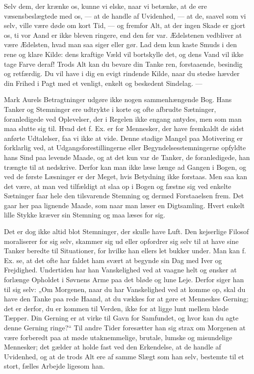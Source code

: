 \documentclass[12pt,a4paper,openany]{book}
\newcommand{\opage}[1]{\marginnote{\footnotesize\textit{[#1]}}}
\begin{document}
Selv dem, der krænke os, kunne vi elske, naar vi betænke,
at de ere væsensbeslægtede med os, --- at de handle
af Uvidenhed, --- at de, saavel som vi selv, ville være døde
om kort Tid, --- og fremfor Alt, at der ingen Skade er gjort
os, ti vor Aand er ikke bleven ringere, end den før var. Ædelstenen
vedbliver at være Ædelsten, hvad man saa siger eller
\setcounter{footnote}{0}%
\opage{113}gør. Lad dem kun kaste Smuds i den rene og klare Kilde:
dens kraftige Væld vil bortskylle det, og dens Vand vil ikke
tage Farve deraf! Trods Alt kan du bevare din Tanke ren,
forstaaende, besindig og retfærdig. Du vil have i dig en evigt
rindende Kilde, naar du stedse hævder din Frihed i Pagt med
et venligt, enkelt og beskedent Sindelag. ---

Mark Aurels Betragtninger udgøre ikke nogen sammenhængende
Bog. Hans Tanker og Stemninger ere udtrykte
i korte og ofte afbrudte Sætninger, foranledigede ved Oplevelser,
der i Regelen ikke engang antydes, men som man
maa slutte sig til. Hvad det f. Ex. er for Mennesker, der
have fremkaldt de sidst anførte Udtalelser, faa vi ikke at vide.
Denne stadige Mangel paa Motivering er forklarlig ved, at Udgangsforestillingerne
eller Begyndelsesstemningerne opfyldte hans
Sind paa levende Maade, og at det kun var de Tanker, de
foranledigede, han trængte til at nedskrive. Derfor kan man
ikke læse længe ad Gangen i Bogen, og ved de første Læsninger
er der Meget, hvis Betydning ikke forstaas. Men saa
kan det være, at man ved tilfældigt at slaa op i Bogen og
fæstne sig ved enkelte Sætninger faar hele den tilsvarende
Stemning og dermed Forstaaelsen frem. Det gaar her paa lignende
Maade, som naar man læser en Digtsamling. Hvert
enkelt lille Stykke kræver sin Stemning og maa læses for sig.

Det er dog ikke altid blot Stemninger, der skulle have
Luft. Den kejserlige Filosof moraliserer for sig selv, skammer
sig ud eller opfordrer sig selv til at have sine Tanker beredte
til Situationer, for hvilke han ellers let bukker under. Man kan
f. Ex. se, at det ofte har faldet ham svært at begynde sin Dag
med Iver og Frejdighed. Undertiden har han Vanskelighed ved
at vaagne helt og ønsker at forlænge Opholdet i Søvnens Arme
paa det bløde og lune Leje. Derfor siger han til sig selv:
„Om Morgenen, naar du har Vanskelighed ved at komme op,
skal du have den Tanke paa rede Haand, at du vækkes for
at gøre et Menneskes Gerning; det er derfor, du er kommen
til Verden, ikke for at ligge lunt mellem bløde Tæpper. Din
Gerning er at virke til Gavn for Samfundet, og hvor kan du
agte denne Gerning ringe?“ Til andre Tider foresætter han sig
\setcounter{footnote}{0}%
\opage{114}strax om Morgenen at være forberedt paa at møde utaknemmelige,
brutale, lumske og misundelige Mennesker; det gælder
at holde fast ved den Erkendelse, at de handle af Uvidenhed,
og at de trods Alt ere af samme Slægt som han selv, bestemte
til et stort, fælles Arbejde ligesom han.
\end{document}
